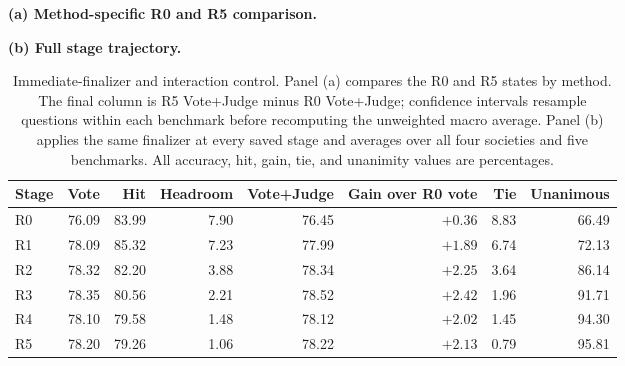 \begin{table}[H]
\centering
\caption{Immediate-finalizer and interaction control. Panel (a) compares the
R0 and R5 states by method. The final column is R5 Vote+Judge minus R0
Vote+Judge; confidence intervals resample questions within each benchmark
before recomputing the unweighted macro average. Panel (b) applies the same
finalizer at every saved stage and averages over all four societies and five
benchmarks. All accuracy, hit, gain, tie, and unanimity values are percentages.}
\label{tab:immediate_finalizer_control}
\vspace{0.3em}
\textbf{(a) Method-specific R0 and R5 comparison.}\\[0.2em]
\scriptsize
{}

\vspace{0.7em}
\textbf{(b) Full stage trajectory.}\\[0.2em]
\small
\begin{tabular}{lrrrrrrr}
\toprule
Stage & Vote & Hit & Headroom & Vote+Judge & Gain over R0 vote & Tie & Unanimous \\
\midrule
R0 & 76.09 & 83.99 & 7.90 & 76.45 & $+0.36$ & 8.83 & 66.49 \\
R1 & 78.09 & 85.32 & 7.23 & 77.99 & $+1.89$ & 6.74 & 72.13 \\
R2 & 78.32 & 82.20 & 3.88 & 78.34 & $+2.25$ & 3.64 & 86.14 \\
R3 & 78.35 & 80.56 & 2.21 & 78.52 & $+2.42$ & 1.96 & 91.71 \\
R4 & 78.10 & 79.58 & 1.48 & 78.12 & $+2.02$ & 1.45 & 94.30 \\
R5 & 78.20 & 79.26 & 1.06 & 78.22 & $+2.13$ & 0.79 & 95.81 \\
\bottomrule
\end{tabular}
\end{table}

